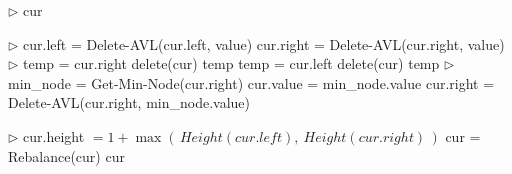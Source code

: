 \documentclass{article}
\begin{document}
\setlength{\algorithmicindent}{.5em}

\begin{algorithm}
\caption{Delete-AVL}
\begin{algorithmic}[1]
    \State $\triangleright$ 
        \State \Return cur
    \EndIf

    \State $\triangleright$ 
        \State cur.left = Delete-AVL(cur.left, value)
        \State cur.right = Delete-AVL(cur.right, value)
    \Else
        \State $\triangleright$ 
            \State temp = cur.right
            \State delete(cur)
            \State \Return temp
            \State temp = cur.left
            \State delete(cur)
            \State \Return temp
        \Else
            \State $\triangleright$ 
            \State min\_node = Get-Min-Node(cur.right)
            \State cur.value = min\_node.value
            \State cur.right = Delete-AVL(cur.right, min\_node.value)
        \EndIf
    \EndIf

    \State $\triangleright$ 
    \State cur.height $= 1 + \max(\,Height(cur.left),\ Height(cur.right)\,)$
    \State cur = Rebalance(cur)
    \State \Return cur
\EndFunction
\end{algorithmic}
\end{algorithm}








\newpage
\clearpage
\end{document}
